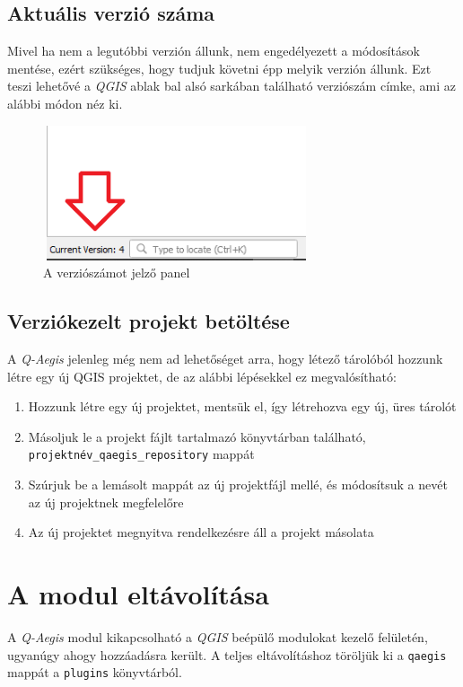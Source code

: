 \subsection{Aktuális verzió száma}
Mivel ha nem a legutóbbi verzión állunk, nem engedélyezett a módosítások mentése, ezért szükséges, hogy tudjuk követni épp melyik verzión állunk. Ezt teszi lehetővé a \emph{QGIS} ablak bal alsó sarkában található verziószám címke, ami az alábbi módon néz ki.
\begin{figure}[H]
	\centering
	\includegraphics[width=0.7\textwidth,height=150px]{images/version_display.png}
	\caption{A verziószámot jelző panel}
	\label{fig:picture-6}
\end{figure}


\subsection{Verziókezelt projekt betöltése}
A \emph{Q-Aegis} jelenleg még nem ad lehetőséget arra, hogy létező tárolóból hozzunk létre egy új QGIS projektet, de az alábbi lépésekkel ez megvalósítható:
\begin{enumerate}
	\item Hozzunk létre egy új projektet, mentsük el, így létrehozva egy új, üres tárolót
	\item Másoljuk le a projekt fájlt tartalmazó könyvtárban található, \texttt{projektnév\_qaegis\_repository} mappát
	\item Szúrjuk be a lemásolt mappát az új projektfájl mellé, és módosítsuk a nevét az új projektnek megfelelőre
	\item Az új projektet megnyitva rendelkezésre áll a projekt másolata
\end{enumerate}
	
\section{A modul eltávolítása}
A \emph{Q-Aegis} modul kikapcsolható a \emph{QGIS} beépülő modulokat kezelő felületén, ugyanúgy ahogy hozzáadásra került. A teljes eltávolításhoz töröljük ki a \texttt{qaegis} mappát a \texttt{plugins} könyvtárból.
	
